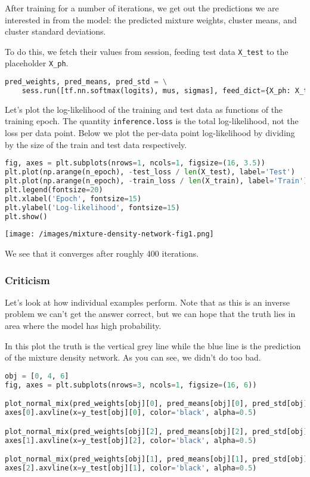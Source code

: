 After training for a number of iterations, we get out the predictions
we are interested in from the model: the predicted mixture weights,
cluster means, and cluster standard deviations.

To do this, we fetch their values from session, feeding test data
\texttt{X_test} to the placeholder \texttt{X_ph}.

\begin{lstlisting}[language=Python]
pred_weights, pred_means, pred_std = \
    sess.run([tf.nn.softmax(logits), mus, sigmas], feed_dict={X_ph: X_test})
\end{lstlisting}

Let's plot the log-likelihood of the training and test data as
functions of the training epoch. The quantity \texttt{inference.loss}
is the total log-likelihood, not the loss per data point. Below we
plot the per-data point log-likelihood by dividing by the size of the
train and test data respectively.

\begin{lstlisting}[language=Python]
fig, axes = plt.subplots(nrows=1, ncols=1, figsize=(16, 3.5))
plt.plot(np.arange(n_epoch), -test_loss / len(X_test), label='Test')
plt.plot(np.arange(n_epoch), -train_loss / len(X_train), label='Train')
plt.legend(fontsize=20)
plt.xlabel('Epoch', fontsize=15)
plt.ylabel('Log-likelihood', fontsize=15)
plt.show()
\end{lstlisting}

\texttt{[image: /images/mixture-density-network-fig1.png]}

We see that it converges after roughly 400 iterations.

\subsubsection{Criticism}

Let's look at how individual examples perform. Note that as this is an
inverse problem we can't get the answer correct, but we can hope that
the truth lies in area where the model has high probability.

In this plot the truth is the vertical grey line while the blue line
is the prediction of the mixture density network. As you can see, we
didn't do too bad.

\begin{lstlisting}[language=Python]
obj = [0, 4, 6]
fig, axes = plt.subplots(nrows=3, ncols=1, figsize=(16, 6))

plot_normal_mix(pred_weights[obj][0], pred_means[obj][0], pred_std[obj][0], axes[0], comp=False)
axes[0].axvline(x=y_test[obj][0], color='black', alpha=0.5)

plot_normal_mix(pred_weights[obj][2], pred_means[obj][2], pred_std[obj][2], axes[1], comp=False)
axes[1].axvline(x=y_test[obj][2], color='black', alpha=0.5)

plot_normal_mix(pred_weights[obj][1], pred_means[obj][1], pred_std[obj][1], axes[2], comp=False)
axes[2].axvline(x=y_test[obj][1], color='black', alpha=0.5)
\end{lstlisting}


